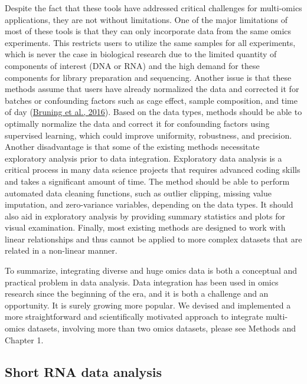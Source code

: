 \documentclass[12pt,twoside]{reedthesis}
\begin{document}
Despite the fact that these tools have addressed critical challenges for
multi-omics applications, they are not without limitations. One of the
major limitations of most of these tools is that they can only
incorporate data from the same omics experiments. This restricts users
to utilize the same samples for all experiments, which is never the case
in biological research due to the limited quantity of components of
interest (DNA or RNA) and the high demand for these components for
library preparation and sequencing. Another issue is that these methods
assume that users have already normalized the data and corrected it for
batches or confounding factors such as cage effect, sample composition,
and time of day (\protect\hyperlink{ref-bruning2016}{Bruning et al., 2016}). Based on the data types, methods should
be able to optimally normalize the data and correct it for confounding
factors using supervised learning, which could improve uniformity,
robustness, and precision. Another disadvantage is that some of the
existing methods necessitate exploratory analysis prior to data
integration. Exploratory data analysis is a critical process in many
data science projects that requires advanced coding skills and takes a
significant amount of time. The method should be able to perform
automated data cleaning functions, such as outlier clipping, missing
value imputation, and zero-variance variables, depending on the data
types. It should also aid in exploratory analysis by providing summary
statistics and plots for visual examination. Finally, most existing
methods are designed to work with linear relationships and thus cannot
be applied to more complex datasets that are related in a non-linear
manner.

To summarize, integrating diverse and huge omics data is both a
conceptual and practical problem in data analysis. Data integration has
been used in omics research since the beginning of the era, and it is
both a challenge and an opportunity. It is surely growing more popular.
We devised and implemented a more straightforward and scientifically
motivated approach to integrate multi-omics datasets, involving more
than two omics datasets, please see Methods and Chapter 1.

\hypertarget{short-rna-data-analysis}{%
\subsection*{Short RNA data analysis}\label{short-rna-data-analysis}}
\end{document}
